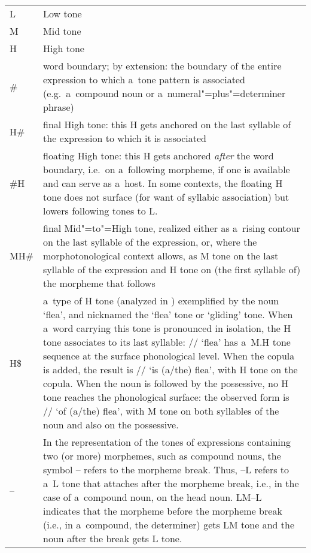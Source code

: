 \begin{refsection}
\begin{table}[H]
	{\renewcommand{\arraystretch}{1.35}
		\begin{tabularx}{\textwidth}{ @{}l Q } 
			L & Low tone\\
			M & Mid tone\\
			H & High tone\\
			\# & word boundary; by extension: the boundary of the entire expression to which a~tone pattern is associated (e.g.~a~compound noun or a~numeral"=plus"=determiner phrase)\\
			H\# & final High tone: this H gets anchored on the last syllable of the expression to which it is associated\\
			\#H & floating High tone: this H gets anchored \textit{after} the word boundary, i.e.\ on a~following morpheme, if one is available and can serve as a~host. In some contexts, the floating H tone does not surface (for want of syllabic association) but lowers following tones to L.\\
			MH\# & final Mid"=to"=High tone, realized either as a~rising contour on the last syllable of the expression, or, where the morphotonological context allows, as M tone on the last syllable of the expression and H tone on (the first syllable of) the morpheme that follows\\
			H\$ & a~type of H tone (analyzed in ) exemplified by the noun ‘flea’, and  nicknamed the ‘flea’ tone or ‘gliding’ tone. When a~word carrying this tone is pronounced in isolation, the H tone associates to its last syllable: // ‘flea’ has a~M.H tone sequence at the surface phonological level. When the copula is added, the result is // ‘is \mbox{(a/the)} flea’, with H tone on the copula. When the noun is followed by the possessive, no H tone reaches the phonological surface: the observed form is // ‘of \mbox{(a/the)} flea’, with M tone on both syllables of the
			noun and also on the possessive.\\
			-- & In the representation of the tones of expressions containing two (or more) morphemes, such as compound nouns, the symbol -- refers to the morpheme break. Thus, --L refers to a~L tone that attaches after the morpheme break, i.e., in the case of a~compound noun, on the head noun. LM--L indicates that the morpheme before the morpheme break (i.e., in a~compound, the determiner) gets LM tone and the noun after the break gets L tone.\\
		\end{tabularx}}
	\end{table}


\end{refsection}
